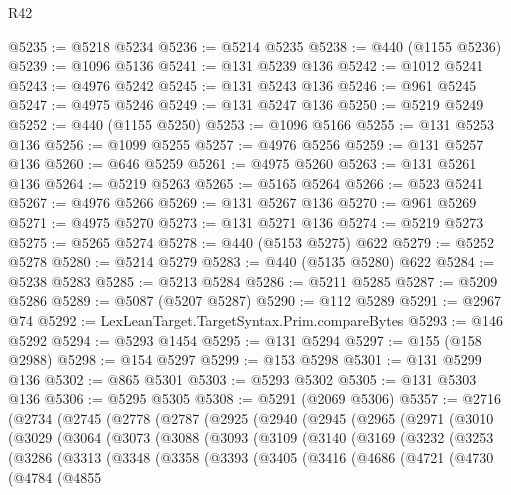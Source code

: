 \begin{lexlean}{R42}
\begin{coremodule}
@5235 := @5218 @5234
@5236 := @5214 @5235
@5238 := @440 (@1155 @5236)
@5239 := @1096 @5136
@5241 := @131 @5239 @136
@5242 := @1012 @5241
@5243 := @4976 @5242
@5245 := @131 @5243 @136
@5246 := @961 @5245
@5247 := @4975 @5246
@5249 := @131 @5247 @136
@5250 := @5219 @5249
@5252 := @440 (@1155 @5250)
@5253 := @1096 @5166
@5255 := @131 @5253 @136
@5256 := @1099 @5255
@5257 := @4976 @5256
@5259 := @131 @5257 @136
@5260 := @646 @5259
@5261 := @4975 @5260
@5263 := @131 @5261 @136
@5264 := @5219 @5263
@5265 := @5165 @5264
@5266 := @523 @5241
@5267 := @4976 @5266
@5269 := @131 @5267 @136
@5270 := @961 @5269
@5271 := @4975 @5270
@5273 := @131 @5271 @136
@5274 := @5219 @5273
@5275 := @5265 @5274
@5278 := @440 (@5153 @5275) @622
@5279 := @5252 @5278
@5280 := @5214 @5279
@5283 := @440 (@5135 @5280) @622
@5284 := @5238 @5283
@5285 := @5213 @5284
@5286 := @5211 @5285
@5287 := @5209 @5286
@5289 := @5087 (@5207 @5287)
@5290 := @112 @5289
@5291 := @2967 @74
@5292 := LexLeanTarget.TargetSyntax.Prim.compareBytes
@5293 := @146 @5292
@5294 := @5293 @1454
@5295 := @131 @5294
@5297 := @155 (@158 @2988)
@5298 := @154 @5297
@5299 := @153 @5298
@5301 := @131 @5299 @136
@5302 := @865 @5301
@5303 := @5293 @5302
@5305 := @131 @5303 @136
@5306 := @5295 @5305
@5308 := @5291 (@2069 @5306)
@5357 := @2716
    (@2734
      (@2745
        (@2778
          (@2787
            (@2925
              (@2940
                (@2945
                  (@2965
                    (@2971
                      (@3010
                        (@3029
                          (@3064
                            (@3073
                              (@3088
                                (@3093
                                  (@3109
                                    (@3140
                                      (@3169
                                        (@3232
                                          (@3253
                                            (@3286
                                              (@3313
                                                (@3348
                                                  (@3358
                                                    (@3393
                                                      (@3405
                                                        (@3416
                                                          (@4686
                                                            (@4721
                                                              (@4730
                                                                (@4784
                                                                  (@4855

\end{coremodule}
\end{lexlean}
